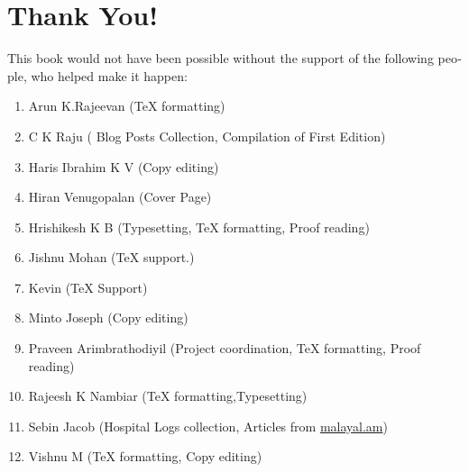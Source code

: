 \section*{Thank You!}
\begin{english}
This book would not have been possible without the support of the following 
people, who helped make it happen:
\begin{enumerate}
 \item Arun K.Rajeevan ({\TeX} formatting)
 \item C K Raju ( Blog Posts Collection, Compilation of First Edition)
 \item Haris Ibrahim K V (Copy editing)
 \item Hiran Venugopalan (Cover Page)
 \item Hrishikesh K B (Typesetting, {\TeX} formatting, Proof reading)
 \item Jishnu Mohan ({\TeX} support.)
 \item Kevin ({\TeX} Support)
 \item Minto Joseph (Copy editing)
 \item Praveen Arimbrathodiyil (Project coordination, {\TeX} formatting, Proof reading)
 \item Rajeesh K Nambiar ({\TeX} formatting,Typesetting)
 \item Sebin Jacob (Hospital Logs collection, Articles from \url{malayal.am})
 \item Vishnu M ({\TeX} formatting, Copy editing)
 
\end{enumerate}
\end{english}
\newpage
